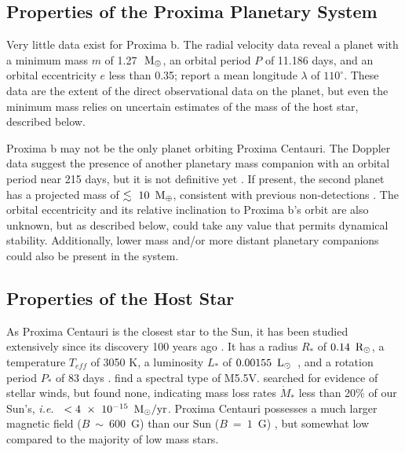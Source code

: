 \documentclass[preprint,12pt]{aastex}
\def\mearth{{\rm\,M_\oplus}}
\def\msun{{\rm\,M_\odot}}
\def\rsun{{\rm\,R_\odot}}
\def\lsun{{\rm\,L_\odot}}
\def\ie{{\it i.e.\ }}
\begin{document}
\subsection{Properties of the Proxima Planetary System}
\label{sec:obs:planetsys}
Very little data exist for Proxima b. The radial velocity data
reveal a planet with a minimum mass $m$ of 1.27~$\mearth$, an orbital period $P$
of 11.186 days, and an orbital eccentricity $e$ less than 0.35;
\cite{AngladaEscude16} report a mean longitude $\lambda$ of $110^\circ$. These
data are the extent of the direct observational data on the planet,
but even the minimum mass relies on uncertain estimates of the mass of
the host star, described below.

Proxima b may not be the only planet orbiting Proxima
Centauri. The Doppler data suggest the presence of another planetary
mass companion with an orbital period near 215 days, but it is not
definitive yet \citep{AngladaEscude16}. If present, the second planet has a
projected mass of $\lesssim~10~\mearth$, consistent with previous
non-detections \citep{EndlKurster08,Barnes14,Lurie14}. The orbital
eccentricity and its relative inclination to Proxima b's orbit are also
unknown, but as described below, could take any value that permits
dynamical stability. Additionally, lower mass and/or more distant
planetary companions could also be present in the system.

\subsection{Properties of the Host Star}
\label{sec:obs:star}
As Proxima Centauri is the closest star to the Sun, it has been studied
extensively since its discovery 100 years ago \citep{Innes1915}.  It
has a radius $R_*$ of $0.14~\rsun$, a temperature $T_{eff}$ of 3050 K, a
luminosity $L_*$ of $0.00155~\lsun$~\citep{Boyajian12}, and a rotation
period $P_*$ of 83 days \citep{Benedict98}. \cite{AngladaEscude16} find a 
spectral type of M5.5V. \cite{Wood01} searched for
evidence of stellar winds, but found none, indicating mass loss rates
$\dot{M}_*$ less than 20\% of our Sun's, \ie
$<4~\times~10^{-15}~\msun/\textrm{yr}$. Proxima Centauri possesses a
much larger magnetic field ($B~\sim~600$~G) than our Sun ($B~=~1$~G)
\citep{ReinersBasri08}, but somewhat low compared to the majority of
low mass stars. 
\end{document}
